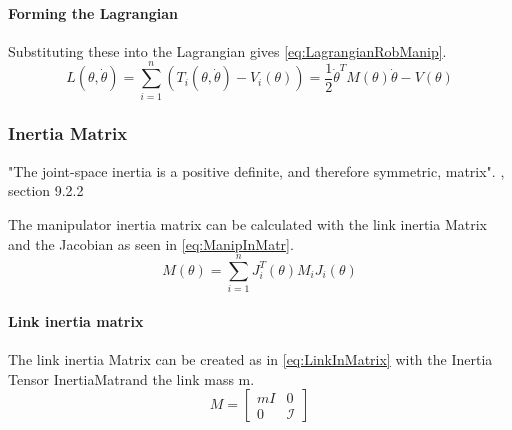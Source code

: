 \paragraph{Forming the Lagrangian}
Substituting these into the Lagrangian gives \ref{eq:LagrangianRobManip}.
\begin{equation}\label{eq:LagrangianRobManip}
	L(\theta, \dot{\theta})= \sum_{i=1}^{n} (T_i(\theta,\dot{\theta})- V_i(\theta)) = \frac{1}{2} \dot{\theta}^T M(\theta)\dot{\theta}-V(\theta)
\end{equation}



%

%
%



\subsubsection{Inertia Matrix }

"The joint-space inertia is a positive definite, and therefore symmetric, matrix". \cite{CorkeRoboticVisionControl}, section 9.2.2

The manipulator inertia matrix can be calculated with the link inertia Matrix and the Jacobian as seen in \ref{eq:ManipInMatr}.
\begin{equation}\label{eq:ManipInMatr}
	M(\theta) = \sum_{i=1}^{n} J_i^T(\theta) M_i J_i(\theta)
\end{equation}

\paragraph{Link inertia matrix}
The link inertia Matrix can be created as in \ref{eq:LinkInMatrix} with the Inertia Tensor \gls{InertiaMatr}and the link mass \gls{m}.
\begin{equation}\label{eq:LinkInMatrix}
	M= 
	\begin{bmatrix}
	mI & 0\\
	0  & \mathcal{I}
	\end{bmatrix}
\end{equation}

